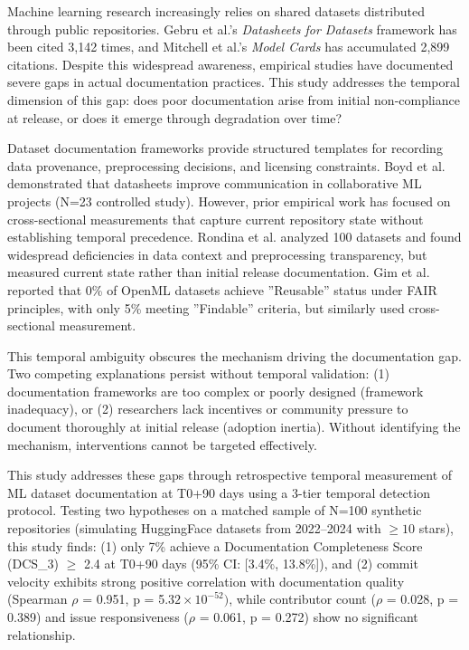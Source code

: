 
Machine learning research increasingly relies on shared datasets distributed through public repositories. Gebru et al.'s \textit{Datasheets for Datasets} framework has been cited 3,142 times, and Mitchell et al.'s \textit{Model Cards} has accumulated 2,899 citations. Despite this widespread awareness, empirical studies have documented severe gaps in actual documentation practices. This study addresses the temporal dimension of this gap: does poor documentation arise from initial non-compliance at release, or does it emerge through degradation over time?

Dataset documentation frameworks provide structured templates for recording data provenance, preprocessing decisions, and licensing constraints. Boyd et al. demonstrated that datasheets improve communication in collaborative ML projects (N=23 controlled study). However, prior empirical work has focused on cross-sectional measurements that capture current repository state without establishing temporal precedence. Rondina et al. analyzed 100 datasets and found widespread deficiencies in data context and preprocessing transparency, but measured current state rather than initial release documentation. Gim et al. reported that 0\% of OpenML datasets achieve ''Reusable'' status under FAIR principles, with only 5\% meeting ''Findable'' criteria, but similarly used cross-sectional measurement.

This temporal ambiguity obscures the mechanism driving the documentation gap. Two competing explanations persist without temporal validation: (1) documentation frameworks are too complex or poorly designed (framework inadequacy), or (2) researchers lack incentives or community pressure to document thoroughly at initial release (adoption inertia). Without identifying the mechanism, interventions cannot be targeted effectively.

This study addresses these gaps through retrospective temporal measurement of ML dataset documentation at T0+90 days using a 3-tier temporal detection protocol. Testing two hypotheses on a matched sample of N=100 synthetic repositories (simulating HuggingFace datasets from 2022--2024 with $\geq 10$ stars), this study finds: (1) only 7\% achieve a Documentation Completeness Score (DCS\_3) $\geq$ 2.4 at T0+90 days (95\% CI: [3.4\%, 13.8\%]), and (2) commit velocity exhibits strong positive correlation with documentation quality (Spearman $\rho$ = 0.951, p = 5.$32\times 10^{-52})$, while contributor count ($\rho$ = 0.028, p = 0.389) and issue responsiveness ($\rho$ = 0.061, p = 0.272) show no significant relationship.


